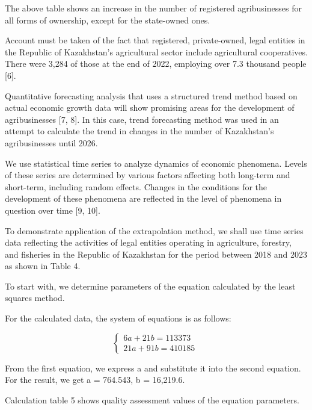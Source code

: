 \begin{multicols}{2}

The above table shows an increase in the number of registered
agribusinesses for all forms of ownership, except for the state-owned
ones.

Account must be taken of the fact that registered, private-owned, legal
entities in the Republic of Kazakhstan's agricultural sector include
agricultural cooperatives. There were 3,284 of those at the end of 2022,
employing over 7.3 thousand people {[}6{]}.

Quantitative forecasting analysis that uses a structured trend method
based on actual economic growth data will show promising areas for the
development of agribusinesses {[}7, 8{]}. In this case, trend
forecasting method was used in an attempt to calculate the trend in
changes in the number of Kazakhstan's agribusinesses until 2026.

We use statistical time series to analyze dynamics of economic
phenomena. Levels of these series are determined by various factors
affecting both long-term and short-term, including random effects.
Changes in the conditions for the development of these phenomena are
reflected in the level of phenomena in question over time {[}9, 10{]}.

To demonstrate application of the extrapolation method, we shall use
time series data reflecting the activities of legal entities operating
in agriculture, forestry, and fisheries in the Republic of Kazakhstan
for the period between 2018 and 2023 as shown in Table 4.

To start with, we determine parameters of the equation calculated by the
least squares method.

For the calculated data, the system of equations is as follows:

\[\left\{ \begin{array}{r}
6a + 21b = 113373 \\
21a + 91b = 410185
\end{array} \right.\ \]

From the first equation, we express a and substitute it into the second
equation. For the result, we get a = 764.543, b = 16,219.6.

Calculation table 5 shows quality assessment values of the equation
parameters.
\end{multicols}


